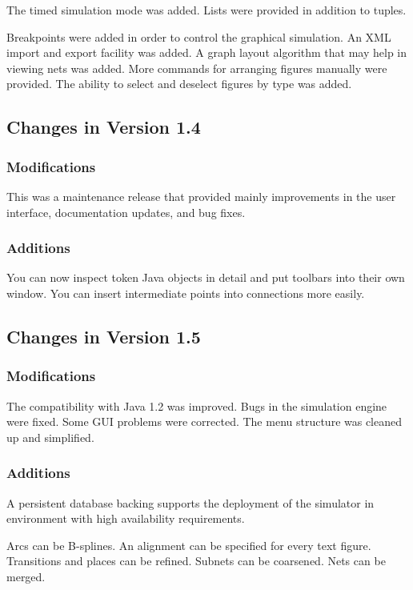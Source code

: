 The timed simulation mode was added.
Lists were provided in addition to tuples.

Breakpoints were added in order to control the
graphical simulation.
An XML import and export facility was added.
A graph layout algorithm that may help in viewing nets
was added. More commands for arranging figures manually were
provided. The ability to select and deselect figures by type
was added.

\subsection{Changes in Version 1.4}

\subsubsection*{Modifications}

This was a maintenance release that provided mainly
improvements in the user interface, documentation updates, and
bug fixes.

\subsubsection*{Additions}

You can now inspect token Java objects in detail and
put toolbars into their own window. You can
insert intermediate points into connections more easily.

\subsection{Changes in Version 1.5}

\subsubsection*{Modifications}

The compatibility with Java 1.2 was improved.
Bugs in the simulation engine were fixed.
Some GUI problems were corrected.
The menu structure was cleaned up and simplified.

\subsubsection*{Additions}

A persistent database backing supports the deployment 
of the simulator in environment with high availability 
requirements.

Arcs can be B-splines. 
An alignment can be specified for every text figure.
Transitions and places can be refined.
Subnets can be coarsened. Nets can be merged.

